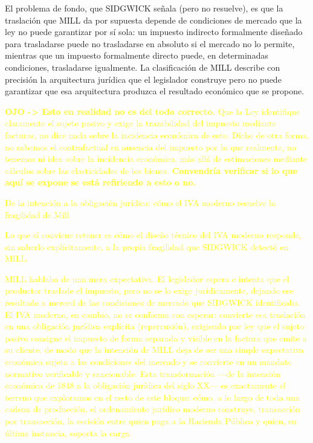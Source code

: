 \documentclass[10pt,a4paper]{article}
\begin{document}
El problema de fondo, que SIDGWICK señala (pero no resuelve), es que la traslación que MILL da por supuesta depende de condiciones de mercado que la ley no puede garantizar por sí sola: un impuesto indirecto formalmente diseñado para trasladarse puede no trasladarse en absoluto si el mercado no lo permite, mientras que un impuesto formalmente directo puede, en determinadas condiciones, trasladarse igualmente. La clasificación de MILL describe con precisión la arquitectura jurídica que el legislador construye pero no puede garantizar que esa arquitectura produzca el resultado económico que se propone.

\textcolor{yellow}{\textbf{OJO -> Esto en realidad no es del todo correcto.} Que la Ley identifique claramente el sujeto pasivo y exige la trazabilidad del impuesto mediante facturas, no dice nada sobre la incidencia económica de este. Dicho de otra forma, no sabemos el contrafactual en ausencia del impuesto por lo que realmente, no tenemos ni idea sobre la incidencia económica, más allá de estimaciones mediante cálculos sobre las elasticidades de los bienes. \textbf{Convendría verificar si lo que aquí se expone se está refiriendo a esto o no.}  

De la intención a la obligación jurídica: cómo el IVA moderno resuelve la fragilidad de Mill

Lo que sí conviene retener es cómo el diseño técnico del IVA moderno responde, sin saberlo explícitamente, a la propia fragilidad que SIDGWICK detectó en MILL. 

MILL hablaba de una mera expectativa. El legislador espera e intenta que el productor traslade el impuesto, pero no se lo exige jurídicamente, dejando ese resultado a merced de las condiciones de mercado que SIDGWICK identificaba. El IVA moderno, en cambio, no se conforma con esperar: convierte esa traslación en una obligación jurídica explícita (repercusión), exigiendo por ley que el sujeto pasivo consigne el impuesto de forma separada y visible en la factura que emite a su cliente, de modo que la intención de MILL deja de ser una simple expectativa económica sujeta a las condiciones del mercado y se convierte en un mandato normativo verificable y sancionable. Esta transformación —de la intención económica de 1848 a la obligación jurídica del siglo XX— es exactamente el terreno que exploramos en el resto de este bloque: cómo, a lo largo de toda una cadena de producción, el ordenamiento jurídico moderno construye, transacción por transacción, la escisión entre quien paga a la Hacienda Pública y quien, en última instancia, soporta la carga.
}
\end{document}
